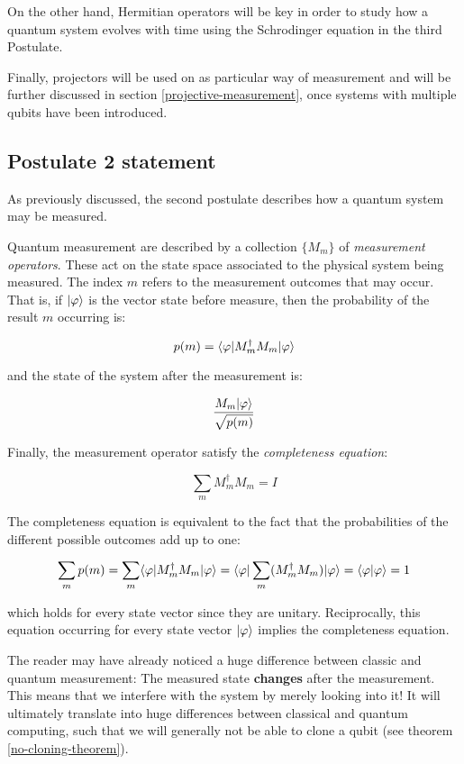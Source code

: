 On the other hand, Hermitian operators will be key in order to study how a quantum system evolves with time using the Schrodinger equation in the third Postulate.

Finally, projectors will be used on as particular way of measurement and will be further discussed in section \ref{projective-measurement}, once systems with multiple qubits have been introduced.


\subsection{Postulate 2 statement}


As previously discussed, the second postulate describes how a quantum system may be measured.

\begin{postulate}
	Quantum measurement are described by a collection $\{M_m\}$ of \emph{measurement operators}. These act on the state space associated to the physical system being measured. The index $m$ refers to the measurement outcomes that may occur. That is, if $|\varphi\rangle$ is the vector state before measure, then the probability of the result $m$ occurring is:
	
	$$p(m) = \langle\varphi|M_m^\dagger M_m|\varphi\rangle $$
	
	and the state of the system after the measurement is:
	
	$$ \frac{M_m|\varphi\rangle}{\sqrt{p(m)}}$$
	
	Finally, the measurement operator satisfy the \emph{completeness equation}: 
	
	$$\sum_m M_m^\dagger M_m = I$$
\end{postulate}

The completeness equation is equivalent to the fact that the probabilities of the different possible outcomes add up to one:

$$ \sum_m p(m) = \sum_m \langle\varphi|M_m^\dagger M_m|\varphi\rangle = \langle\varphi|\sum_m (M_m^\dagger M_m)|\varphi\rangle = \langle\varphi|\varphi\rangle = 1 $$

which holds for every state vector since they are unitary. Reciprocally, this equation occurring for every state vector $|\varphi\rangle$ implies the completeness equation.

The reader may have already noticed a huge difference between classic and quantum measurement: The measured state \textbf{changes} after the measurement. This means that we interfere with the system by merely looking into it! It will ultimately translate into huge differences between classical and quantum computing, such that we will generally not be able to clone a qubit (see theorem \ref{no-cloning-theorem}).

